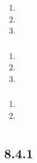 \subsubsection{}\label{section-45}

\begin{enumerate}
\def\labelenumi{\arabic{enumi}.}
\tightlist
\item
\item
\item
\end{enumerate}

\subsubsection{}\label{section-46}

\begin{enumerate}
\def\labelenumi{\arabic{enumi}.}
\tightlist
\item
\item
\item
\end{enumerate}

\subsubsection{}\label{section-47}

\begin{enumerate}
\def\labelenumi{\arabic{enumi}.}
\tightlist
\item
\item
\end{enumerate}

\subsection{}\label{section-48}

\section{}\label{section-49}

\subsection{}\label{section-50}

\subsection{8.4.1}\label{section-51}

